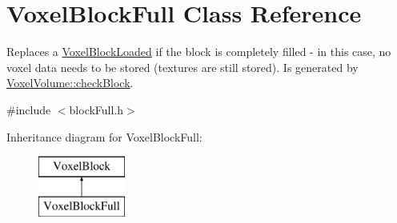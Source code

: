 \hypertarget{classVoxelBlockFull}{
\section{\-Voxel\-Block\-Full \-Class \-Reference}
\label{db/d9c/classVoxelBlockFull}
}


\-Replaces a \hyperlink{classVoxelBlockLoaded}{\-Voxel\-Block\-Loaded} if the block is completely filled -\/ in this case, no voxel data needs to be stored (textures are still stored). \-Is generated by \hyperlink{classVoxelVolume_a0a1e8cdc7c5c2ba73b08e3418579efce}{\-Voxel\-Volume\-::check\-Block}.  




{\ttfamily \#include $<$block\-Full.\-h$>$}

\-Inheritance diagram for \-Voxel\-Block\-Full\-:\begin{figure}[H]
\begin{center}
\leavevmode
\includegraphics[height=2.000000cm]{db/d9c/classVoxelBlockFull}
\end{center}
\end{figure}
